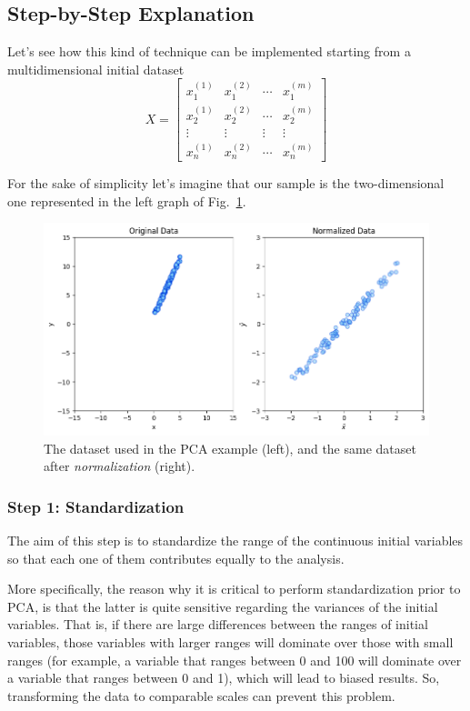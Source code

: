 \subsection{Step-by-Step Explanation}

Let's see how this kind of technique can be implemented starting from a multidimensional initial dataset 
\begin{equation}
	X=\begin{bmatrix}
		x^{(1)}_1 &x^{(2)}_1&\cdots &x^{(m)}_1 \\
		x^{(1)}_2 &x^{(2)}_2&\cdots &x^{(m)}_2 \\
		\vdots &\vdots &\vdots &\vdots \\
		x^{(1)}_n &x^{(2)}_n&\cdots &x^{(m)}_n 
	\end{bmatrix}
\end{equation}

For the sake of simplicity let's imagine that our sample is the two-dimensional one represented in the left graph of Fig.~\ref{fig:pca_dataset}.

\begin{figure}[htb]
	\centering
	\includegraphics[width=0.9\linewidth]{figures/pca_raw_std_data.png}
	\caption{The dataset used in the PCA example (left), and the same dataset after \emph{normalization} (right).}
	\label{fig:pca_dataset}
\end{figure}

\subsubsection*{Step 1: Standardization}

The aim of this step is to standardize the range of the continuous initial variables so that each one of them contributes equally to the analysis.

More specifically, the reason why it is critical to perform standardization prior to PCA, is that the latter is quite sensitive regarding the variances of the initial variables. That is, if there are large differences between the ranges of initial variables, those variables with larger ranges will dominate over those with small ranges (for example, a variable that ranges between 0 and 100 will dominate over a variable that ranges between 0 and 1), which will lead to biased results. So, transforming the data to comparable scales can prevent this problem.

